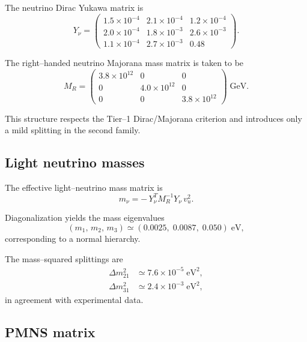\documentclass[11pt]{article}
\begin{document}
The neutrino Dirac Yukawa matrix is
\begin{equation}
Y_\nu =
\begin{pmatrix}
1.5\times10^{-4} & 2.1\times10^{-4} & 1.2\times10^{-4} \\
2.0\times10^{-4} & 1.8\times10^{-3} & 2.6\times10^{-3} \\
1.1\times10^{-4} & 2.7\times10^{-3} & 0.48
\end{pmatrix}.
\label{eq:Ynu-exec}
\end{equation}

The right--handed neutrino Majorana mass matrix is taken to be
\begin{equation}
M_R =
\begin{pmatrix}
3.8\times10^{12} & 0 & 0 \\
0 & 4.0\times10^{12} & 0 \\
0 & 0 & 3.8\times10^{12}
\end{pmatrix}
\;\mathrm{GeV}.
\label{eq:MR-exec}
\end{equation}

This structure respects the Tier--1 Dirac/Majorana criterion and
introduces only a mild splitting in the second family.

\subsection{Light neutrino masses}

The effective light--neutrino mass matrix is
\[
m_\nu = -\,Y_\nu^T M_R^{-1} Y_\nu\, v_u^2 .
\]

Diagonalization yields the mass eigenvalues
\begin{equation}
(m_1,\,m_2,\,m_3)
\simeq
(0.0025,\;0.0087,\;0.050)\;\mathrm{eV},
\label{eq:nu-masses}
\end{equation}
corresponding to a normal hierarchy.

The mass--squared splittings are
\begin{align}
\Delta m_{21}^2 &\simeq 7.6\times10^{-5}\;\mathrm{eV}^2, \\
\Delta m_{31}^2 &\simeq 2.4\times10^{-3}\;\mathrm{eV}^2,
\end{align}
in agreement with experimental data.

\subsection{PMNS matrix}
\end{document}
